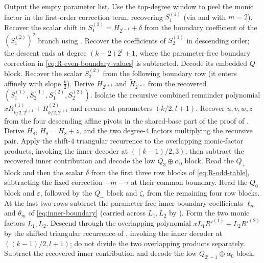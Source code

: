 \begin{algorithm}[H]
\begin{algorithmic}
      \State Output the empty parameter list.
      \State Use the top-degree window to peel the monic factor in the first-order correction term, recovering $S^{(1)}_1$ (via  and  with $m=2$).
      \State Recover the scalar shift in $S^{(2)}_1=H_{2^{l-1}}+\delta$ from the boundary coefficient of the $(S^{(2)}_1)^2$ branch using .
      \State Recover the coefficients of $S^{(1)}_2$ in descending order; the descent ends at degree $(k-2)2^l+1$, where the parameter-free boundary correction in \eqref{eq:R-even-boundary-values} is subtracted.  Decode its embedded $Q$ block.
      \State Recover the scalar $S^{(2)}_2$ from the following boundary row (it enters affinely with slope $\tfrac{k}{2}$).
      \State Derive $H_{2^{l+1}}$ and $\tilde H_{2^{l+1}}$ from the recovered $(S^{(1)}_1,S^{(1)}_2,S^{(2)}_1,S^{(2)}_2)$.
      \State Isolate the recursive combined remainder polynomial $xR^{(1)}_{k/2,2^{l+1}}+R^{(2)}_{k/2,2^{l+1}}$ and recurse at parameters $(k/2,l+1)$.
      \State Recover $u,v,w,z$ from the four descending affine pivots in the shared-base part of the proof of .
      \State Derive $H_8$, $\tilde H_8=H_8+z$, and the two degree-$4$ factors multiplying the recursive pair.
      \State Apply the shift-$4$ triangular recurrence to the overlapping monic-factor products, invoking the inner decoder at $((k-1)/2,3)$; then subtract the recovered inner contribution and decode the low $Q_3\mathbin{\oplus}\alpha_0$ block.
    \Else {}
      \State Read the $Q_+$ block and then the scalar $\delta$ from the first three row blocks of \eqref{eq:R-odd-table}, subtracting the fixed correction $-m-\tau$ at their common boundary.
      \State Read the $Q_0$ block and $\varepsilon$, followed by the $Q_-$ block and $\zeta$, from the remaining four row blocks.  At the last two rows subtract the parameter-free inner boundary coefficients $\ell_m$ and $\theta_m$ of \eqref{eq:inner-boundary} (carried across $L_1,L_2$ by ).
      \State Form the two monic factors $L_1,L_2$.  Descend through the overlapping polynomial $xL_1R'^{(1)}+L_2R'^{(2)}$ by the shifted triangular recurrence of , invoking the inner decoder at $((k-1)/2,l+1)$; do not divide the two overlapping products separately.
      \State Subtract the recovered inner contribution and decode the low $Q_{2^l-1}\mathbin{\oplus}\alpha_0$ block.
    \EndIf
  \end{algorithmic}
\end{algorithm}


